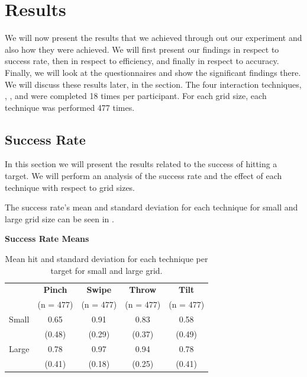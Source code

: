 \section{Results}
We will now present the results that we achieved through out our experiment and also how they were achieved. We will first present our findings in respect to success rate, then in respect to efficiency, and finally in respect to accuracy. Finally, we will look at the questionnaires and show the significant findings there. We will discuss these results later, in the  section.  
The four interaction techniques, \pinch, \swipe, \throw and \tilt were completed 18 times per participant. 
For each grid size, each technique was performed 477 times. 

\subsection{Success Rate}
In this section we will present the results related to the success of hitting a target.
We will perform an analysis of the success rate and the effect of each technique with respect to grid sizes.

The success rate's mean and standard deviation for each technique for small and large grid size can be seen in .

\begin{table}[H]
	\centering
	\textbf{Success Rate Means}\\[4pt]
	\begin{adjustbox}{width=\columnwidth}
	\begin{tabular}{|c|c|c|c|c|}
			\hline
			\rowcolor[HTML]{9B9B9B} 
			& \textbf{Pinch} & \textbf{Swipe} & \textbf{Throw} & \textbf{Tilt} \\
			\rowcolor[HTML]{9B9B9B} 
			 & (n = 477) & (n = 477) & (n = 477) & (n = 477) \\ \hline
			Small & 0.65        & 0.91         & 0.83         & 0.58        \\
			 & (0.48)        & (0.29)         & (0.37)         & (0.49)        \\ \hline
			Large & 0.78        & 0.97         & 0.94         & 0.78        \\
			 & (0.41)        & (0.18)         & (0.25)         & (0.41)        \\ \hline
	\end{tabular}
	\end{adjustbox}
	\caption{Mean hit  and standard deviation for each technique per target for small and large grid.}
	\label{tab:meanHitTechnique}
\end{table}

